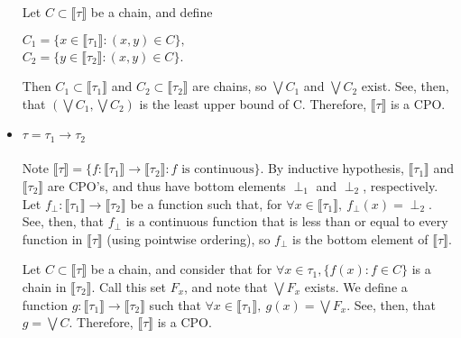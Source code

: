 \documentclass{westhesis}
\theoremstyle{plain}
\theoremstyle{definition}
\begin{document}
\begin{HEAD}
\begin{itemize}
Let $C \subset \llbracket \tau \rrbracket$ be a
chain, and define
\begin{center}
$C_1 = \{x \in \llbracket \tau_1 \rrbracket : (x,y) \in C\},$ \\
$C_2 = \{ y \in \llbracket \tau_2 \rrbracket: (x,y) \in C\}$. \\ 
\end{center}
Then $C_1 \subset \llbracket \tau_1 \rrbracket$ and $C_2 \subset \llbracket \tau_2 \rrbracket$ are chains, so $\bigvee C_1$
and $\bigvee C_2$ exist. See, then, that $(\bigvee C_1, \bigvee C_2)$ is the least upper bound of C. Therefore, $\llbracket 
\tau \rrbracket$ is a CPO.
\item $\tau = \tau_1 \rightarrow \tau_2$ \\ \\
Note $\llbracket \tau \rrbracket = \{f : \llbracket \tau_1 \rrbracket \rightarrow \llbracket \tau_2 \rrbracket : f \text{ is continuous}\}
$. By inductive hypothesis, $\llbracket \tau_1 \rrbracket$ and $\llbracket \tau_2 \rrbracket$ are CPO's, and thus have bottom
elements $\perp_1$ and $\perp_2$, respectively. Let $f_{\perp}: \llbracket \tau_1 \rrbracket \rightarrow \llbracket \tau_2 
\rrbracket$ be a function such that, for $\forall x \in \llbracket \tau_1 \rrbracket, \ f_{\perp}(x) = \perp_2$. See, then, that 
$f_{\perp}$ is a continuous function that is less than or equal to every function in $\llbracket \tau \rrbracket$ (using pointwise
ordering), so $f_{\perp}$ is the bottom element of $\llbracket \tau \rrbracket$.  

Let $C \subset \llbracket \tau \rrbracket$ be a 
chain, and consider that for $\forall x \in \tau_1, \{f(x) : f \in C\}$ is a chain in $\llbracket \tau_2 \rrbracket$. Call this set $F_x$,
and note that $\bigvee F_x$ exists. We define a function $g: \llbracket \tau_1 \rrbracket \rightarrow \llbracket \tau_2 \rrbracket$ 
such that $\forall x \in \llbracket \tau_1 \rrbracket, \ g(x) = \bigvee F_x$. See, then, that $g = \bigvee C$. Therefore, $\llbracket
\tau \rrbracket$ is a CPO.
\end{itemize}

\end{HEAD}
\end{document}
